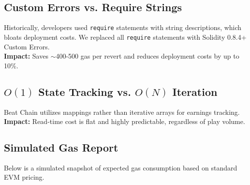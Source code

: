 \documentclass[11pt,a4paper]{article}
\begin{document}
\subsection{Custom Errors vs. Require Strings}
Historically, developers used \texttt{require} statements with string descriptions, which bloats deployment costs. We replaced all \texttt{require} statements with Solidity 0.8.4+ Custom Errors. \\
\textbf{Impact:} Saves $\sim$400-500 gas per revert and reduces deployment costs by up to 10\%.

\subsection{$O(1)$ State Tracking vs. $O(N)$ Iteration}
Beat Chain utilizes mappings rather than iterative arrays for earnings tracking. \\
\textbf{Impact:} Read-time cost is flat and highly predictable, regardless of play volume.

\subsection{Simulated Gas Report}
Below is a simulated snapshot of expected gas consumption based on standard EVM pricing.
\end{document}
